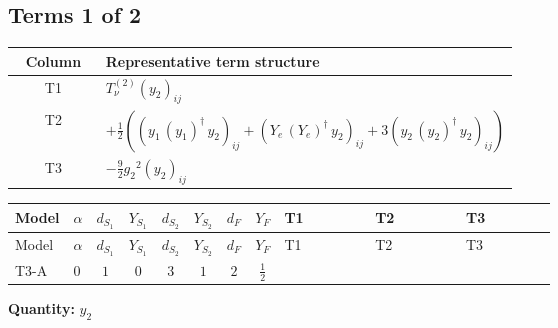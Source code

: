 \documentclass[8pt]{article}
\begin{document}
\begin{landscape}
\subsection*{Terms 1 of 2}
\begin{center}
\begin{tabular}{@{}c >{\raggedright\arraybackslash}p{0.82\linewidth}@{}}
\toprule
Column & Representative term structure \\
\midrule
T1 & \(\displaystyle T_{\nu}^{(2)} \left({y_2}\right)_{ij}\) \\
\midrule
T2 & \(\displaystyle +\frac{1}{2} (\left({y_1}\,\left({y_1}\right)^{\dagger}\,{y_2}\right)_{ij}+\left({Y_e}\,\left({Y_e}\right)^{\dagger}\,{y_2}\right)_{ij}+3 \left({y_2}\,\left({y_2}\right)^{\dagger}\,{y_2}\right)_{ij})\) \\
\midrule
T3 & \(\displaystyle -\frac{9}{2} {g_2}^2 \left({y_2}\right)_{ij}\) \\
\midrule
\bottomrule
\end{tabular}
\end{center}
\smallskip
\tiny
\begin{longtable}{@{}llcccccc >{\raggedright\arraybackslash}p{0.21\linewidth} >{\raggedright\arraybackslash}p{0.21\linewidth} >{\raggedright\arraybackslash}p{0.21\linewidth}@{}}
\toprule
Model & $\alpha$ & $d_{S_1}$ & $Y_{S_1}$ & $d_{S_2}$ & $Y_{S_2}$ & $d_F$ & $Y_F$ & T1 & T2 & T3 \\
\midrule
\endfirsthead
\toprule
Model & $\alpha$ & $d_{S_1}$ & $Y_{S_1}$ & $d_{S_2}$ & $Y_{S_2}$ & $d_F$ & $Y_F$ & T1 & T2 & T3 \\
\midrule
\endhead
T3-A & $0$ & $1$ & $0$ & $3$ & $1$ & $2$ & $\frac{1}{2}$ & \scriptsize\adjustbox{max width=\linewidth}{$\begin{gathered} T_{\nu}^{(2)} \left({y_2}\right)_{ij}\end{gathered}$} & \scriptsize\adjustbox{max width=\linewidth}{$\begin{gathered} +\frac{1}{2} (\left({y_1}\,\left({y_1}\right)^{\dagger}\,{y_2}\right)_{ij}+\left({Y_e}\,\left({Y_e}\right)^{\dagger}\,{y_2}\right)_{ij}+3 \left({y_2}\,\left({y_2}\right)^{\dagger}\,{y_2}\right)_{ij})\end{gathered}$} & \scriptsize\adjustbox{max width=\linewidth}{$\begin{gathered} -\frac{9}{2} {g_2}^2 \left({y_2}\right)_{ij}\end{gathered}$} \\
\midrule
\bottomrule
\end{longtable}
\clearpage
\noindent\textbf{Quantity: }$y_2$\par\smallskip

\end{landscape}
\end{document}

